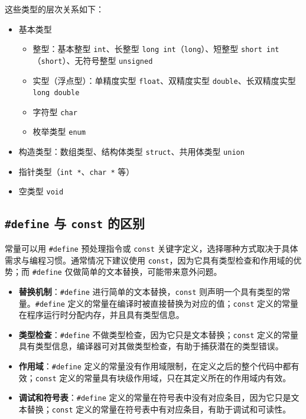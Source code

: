 这些类型的层次关系如下：

\begin{itemize}
    \item 基本类型
    \begin{itemize}
        \item 整型：基本整型 \texttt{int}、长整型 \texttt{long int}（\texttt{long}）、短整型 \texttt{short int}（\texttt{short}）、无符号整型 \texttt{unsigned}
        \item 实型（浮点型）：单精度实型 \texttt{float}、双精度实型 \texttt{double}、长双精度实型 \texttt{long double}
        \item 字符型 \texttt{char}
        \item 枚举类型 \texttt{enum}
    \end{itemize}
    \item 构造类型：数组类型、结构体类型 \texttt{struct}、共用体类型 \texttt{union}
    \item 指针类型（\texttt{int *}、\texttt{char *} 等）
    \item 空类型 \texttt{void}
\end{itemize}

\subsection{\texttt{\#define} 与 \texttt{const} 的区别}
常量可以用 \texttt{\#define} 预处理指令或 \texttt{const} 关键字定义，选择哪种方式取决于具体需求与编程习惯。通常情况下建议使用 \texttt{const}，因为它具有类型检查和作用域的优势；而 \texttt{\#define} 仅做简单的文本替换，可能带来意外问题。

\begin{itemize}
    \item \textbf{替换机制}：\texttt{\#define} 进行简单的文本替换，\texttt{const} 则声明一个具有类型的常量。\texttt{\#define} 定义的常量在编译时被直接替换为对应的值；\texttt{const} 定义的常量在程序运行时分配内存，并且具有类型信息。
    \item \textbf{类型检查}：\texttt{\#define} 不做类型检查，因为它只是文本替换；\texttt{const} 定义的常量具有类型信息，编译器可对其做类型检查，有助于捕获潜在的类型错误。
    \item \textbf{作用域}：\texttt{\#define} 定义的常量没有作用域限制，在定义之后的整个代码中都有效；\texttt{const} 定义的常量具有块级作用域，只在其定义所在的作用域内有效。
    \item \textbf{调试和符号表}：\texttt{\#define} 定义的常量在符号表中没有对应条目，因为它只是文本替换；\texttt{const} 定义的常量在符号表中有对应条目，有助于调试和可读性。
\end{itemize}

